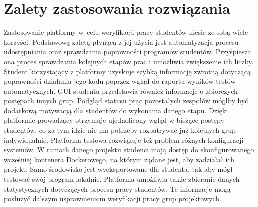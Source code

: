 \section{Zalety zastosowania rozwiązania}

Zastosowanie platformy w~celu weryfikacji pracy studentów niesie ze sobą wiele korzyści.
Podstawową zaletą płynącą z jej użycia jest automatyzacja procesu udostępniania oraz sprawdzania poprawności programów studentów.
Przyśpiesza ona proces sprawdzania kolejnych etapów prac i umożliwia zwiększenie ich liczby.
Student korzystający z platformy uzyskuje szybką informację zwrotną dotyczącą poprawności działania jego kodu poprzez wgląd do raportu wyników testów automatycznych.
GUI studenta przedstawia również informację o zbiorczych postępach innych grup.
Podgląd statusu prac pozostałych zespołów mógłby być dodatkową motywacją dla studentów do wykonania danego etapu.
Dzięki platformie prowadzący otrzymuje ujednolicony wgląd w bieżące postępy studentów, co za tym idzie nie ma potrzeby rozpatrywać już kolejnych grup indywidualnie.
Platforma testowa rozwiązuje też problem różnych konfiguracji systemów.
W ramach danego projektu studenci mają dostęp do skonfigurowanego wcześniej kontenera Dockerowego, na którym żądane jest, aby zadziałał ich projekt.
Samo środowisko jest wyeksportowane dla studenta, tak aby mógł testować swój program lokalnie.
Platforma umożliwia także zbieranie danych statystycznych dotyczących procesu pracy studentów.
Te informacje mogą posłużyć dalszym usprawnieniom weryfikacji pracy grup projektowych.